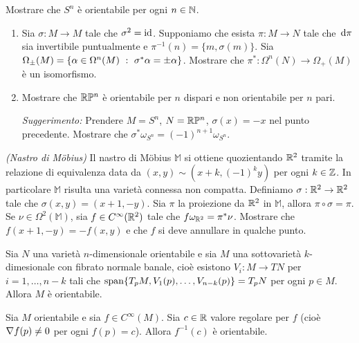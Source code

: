 \begin{exercise}
Mostrare che $S^n$ è orientabile per ogni $n\in\mathbb N$.
\end{exercise}
\begin{exercise}
	\begin{enumerate}
		\item Sia $\sigma:M\to M$ tale che $\sigma^2=\mathrm{id}$. Supponiamo che esista $\pi:M\to N$ tale che $\,\mathrm d \pi$ sia invertibile puntualmente e $\pi^{-1}(n) = \{m,\sigma(m)\}$. Sia $\Omega_\pm(M) = \{ \alpha\in\Omega^n(M) \ :\  \sigma^*\alpha = \pm\alpha \}$. Mostrare che $\pi^* : \Omega^n(N) \to \Omega_+(M)$ è un isomorfismo.
		
		\item Mostrare che $\mathbb R \mathbb P^n$ è orientabile per $n$ dispari e non orientabile per $n$ pari.
		
		\emph{Suggerimento:} Prendere $M=S^n$, $N=\mathbb R\mathbb P^n$, $\sigma(x)=-x$ nel punto precedente. Mostrare che $\sigma^*\omega_{S^n} = (-1)^{n+1} \omega_{S^n}$.
	\end{enumerate}
\end{exercise}
\begin{exercise}
	\emph{(Nastro di M\"{o}bius)} Il nastro di M\"{o}bius $\mathbb M$ si ottiene quozientando $\mathbb R^2$ tramite la relazione di equivalenza data da $(x,y) \sim (x+k,(-1)^ky)$ per ogni $k\in\mathbb Z$.  
	In particolare $\mathbb M$ risulta una varietà connessa non compatta. Definiamo $\sigma:\mathbb R^2\to\mathbb R^2$ tale che $\sigma(x,y) = (x+1,-y)$. Sia $\pi$ la proiezione da $\mathbb R^2$ in $\mathbb M$, allora $\pi\circ\sigma=\pi$.
	Se $\nu\in\Omega^2(\mathbb M)$, sia $f\in C^\infty(\mathbb R^2)$ tale che $f\omega_{\mathbb R^2} = \pi^*\nu$.
	Mostrare che $f(x+1,-y) = -f(x,y)$ e che $f$ si deve annullare in qualche punto.
\end{exercise}

\begin{proposition} 
	Sia $N$ una varietà $n$-dimensionale orientabile e sia $M$ una sottovarietà $k$-dimesionale con fibrato normale banale, cioè esistono $V_i:M\to TN$ per $i=1,\ldots,n-k$ tali che $\mathrm{span}\{ T_pM,V_1(p), \ldots, V_{n-k}(p) \} = T_pN$ per ogni $p\in M$.
	Allora $M$ è orientabile.
\end{proposition}

\begin{corollary}
	Sia $M$ orientabile e sia $f \in C^\infty(M)$. Sia $c\in\mathbb R$ valore regolare per $f$ (cioè $\nabla f (p)\not=0$ per ogni $f(p)=c$). Allora $f^{-1}(c)$ è orientabile. 
\end{corollary}

